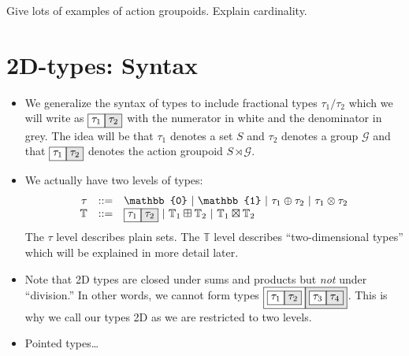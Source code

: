 \documentclass{article}
\newcommand{\alt}{~|~}
\newcommand{\zt}{\mathbb{0}}
\newcommand{\ot}{\mathbb{1}}
\newcommand{\G}{\mathcal{G}}
\newcommand{\twod}{\mathbb{T}}
\newcommand{\fract}[2]{\fcolorbox{black}{white}{$#1$}\fcolorbox{black}{gray!20}{$#2$}}
\begin{document}
Give lots of examples of action groupoids. Explain cardinality.
 
\section{2D-types: Syntax}
 
\begin{itemize}
\item We generalize the syntax of types to include fractional types
  $\tau_1/\tau_2$ which we will write as $\fract{\tau_1}{\tau_2}$ with
  the numerator in white and the denominator in grey. The idea will be
  that $\tau_1$ denotes a set $S$ and $\tau_2$ denotes a group $\G$
  and that $\fract{\tau_1}{\tau_2}$ denotes the action groupoid
  $S \rtimes \G$.

\item We actually have two levels of types:
\[\begin{array}{rcl} 
\tau &::=& \zt \alt \ot \alt \tau_1\oplus\tau_2 \alt \tau_1\otimes\tau_2 \\
\twod &::=& \fract{\tau_1}{\tau_2} \alt \twod_1 \boxplus \twod_2
            \alt \twod_1 \boxtimes \twod_2  
\end{array}\]
The $\tau$ level describes plain sets. The $\twod$ level describes
``two-dimensional types'' which will be explained in more detail
later. 
\item Note that 2D types are closed under sums and products but
  \emph{not} under ``division.'' In other words, we cannot form types
  $\fract{\fract{\tau_1}{\tau_2}}{\fract{\tau_3}{\tau_4}}$. This is
  why we call our types 2D as we are restricted to two levels.

\item Pointed types\ldots




\end{itemize}
\end{document}
